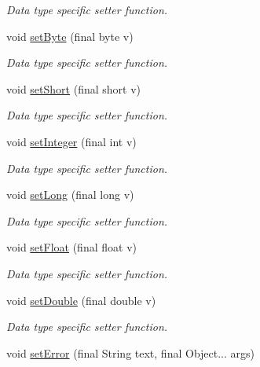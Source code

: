 \begin{DoxyCompactItemize}
\begin{DoxyCompactList}\small\item\em Data type specific setter function. \end{DoxyCompactList}\item 
void \hyperlink{classorg_1_1libelektra_1_1Key_ab9576c2e1e526ee23904a50b02386b45}{set\+Byte} (final byte v)
\begin{DoxyCompactList}\small\item\em Data type specific setter function. \end{DoxyCompactList}\item 
void \hyperlink{classorg_1_1libelektra_1_1Key_ac1621a8d43992b40b6b20a0e45182376}{set\+Short} (final short v)
\begin{DoxyCompactList}\small\item\em Data type specific setter function. \end{DoxyCompactList}\item 
void \hyperlink{classorg_1_1libelektra_1_1Key_a290d278b4c11ea4bcabf82c0c97e6350}{set\+Integer} (final int v)
\begin{DoxyCompactList}\small\item\em Data type specific setter function. \end{DoxyCompactList}\item 
void \hyperlink{classorg_1_1libelektra_1_1Key_ac02de55fc0a3eb10372de7fa146db937}{set\+Long} (final long v)
\begin{DoxyCompactList}\small\item\em Data type specific setter function. \end{DoxyCompactList}\item 
void \hyperlink{classorg_1_1libelektra_1_1Key_a1436207a0efa244538c935766b8db470}{set\+Float} (final float v)
\begin{DoxyCompactList}\small\item\em Data type specific setter function. \end{DoxyCompactList}\item 
void \hyperlink{classorg_1_1libelektra_1_1Key_a2c411133e9a8d13df30d08041678a5a0}{set\+Double} (final double v)
\begin{DoxyCompactList}\small\item\em Data type specific setter function. \end{DoxyCompactList}\item 
void \hyperlink{classorg_1_1libelektra_1_1Key_a1f71503902725f238f81a1211eb5d9d5}{set\+Error} (final String text, final Object... args)

\end{DoxyCompactItemize}
